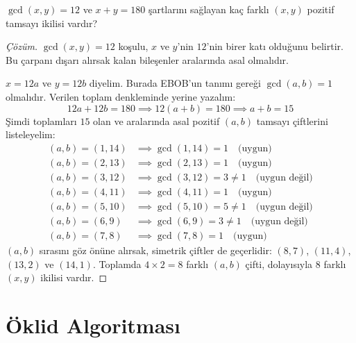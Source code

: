 \begin{example}
$\gcd(x, y) = 12$ ve $x + y = 180$ şartlarını sağlayan kaç farklı $(x, y)$ pozitif tamsayı ikilisi vardır?
\end{example}

\begin{proof}[Çözüm]
$\gcd(x, y) = 12$ koşulu, $x$ ve $y$'nin $12$'nin birer katı olduğunu belirtir. Bu çarpanı dışarı alırsak kalan bileşenler aralarında asal olmalıdır.

$x = 12a$ ve $y = 12b$ diyelim. Burada EBOB'un tanımı gereği $\gcd(a, b) = 1$ olmalıdır.
Verilen toplam denkleminde yerine yazalım:
\[ 12a + 12b = 180 \implies 12(a + b) = 180 \implies a + b = 15 \]
Şimdi toplamları $15$ olan ve aralarında asal pozitif $(a, b)$ tamsayı çiftlerini listeleyelim:
\begin{align*}
    (a, b) = (1, 14) &\implies \gcd(1, 14) = 1 \quad \text{(uygun)} \\
    (a, b) = (2, 13) &\implies \gcd(2, 13) = 1 \quad \text{(uygun)} \\
    (a, b) = (3, 12) &\implies \gcd(3, 12) = 3 \neq 1 \quad \text{(uygun değil)} \\
    (a, b) = (4, 11) &\implies \gcd(4, 11) = 1 \quad \text{(uygun)} \\
    (a, b) = (5, 10) &\implies \gcd(5, 10) = 5 \neq 1 \quad \text{(uygun değil)} \\
    (a, b) = (6, 9)  &\implies \gcd(6, 9) = 3 \neq 1 \quad \text{(uygun değil)} \\
    (a, b) = (7, 8)  &\implies \gcd(7, 8) = 1 \quad \text{(uygun)}
\end{align*}
$(a, b)$ sırasını göz önüne alırsak, simetrik çiftler de geçerlidir: $(8, 7)$, $(11, 4)$, $(13, 2)$ ve $(14, 1)$.
Toplamda $4 \times 2 = 8$ farklı $(a, b)$ çifti, dolayısıyla $8$ farklı $(x, y)$ ikilisi vardır.
\end{proof}

\noindent{}

\section{Öklid Algoritması}

